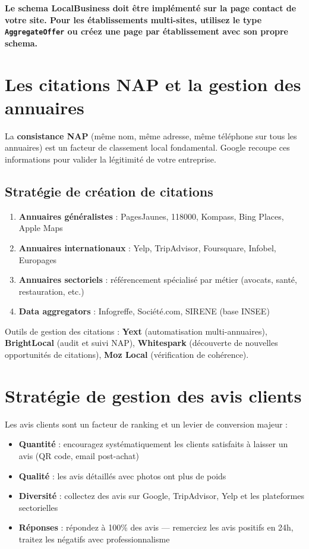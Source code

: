 \documentclass[12pt,a4paper,twoside]{report}
\newcommand{\keyword}[1]{\textbf{\textcolor{googleblue}{#1}}}
\newcommand{\important}[1]{\textbf{\textcolor{googlered}{#1}}}
\begin{document}
\important{Le schema LocalBusiness doit être implémenté sur la page contact de votre site. Pour les établissements multi-sites, utilisez le type \texttt{AggregateOffer} ou créez une page par établissement avec son propre schema.}

\section{Les citations NAP et la gestion des annuaires}

La \keyword{consistance NAP} (même nom, même adresse, même téléphone sur tous les annuaires) est un facteur de classement local fondamental. Google recoupe ces informations pour valider la légitimité de votre entreprise.

\subsection{Stratégie de création de citations}

\begin{enumerate}
    \item \textbf{Annuaires généralistes} : PagesJaunes, 118000, Kompass, Bing Places, Apple Maps
    \item \textbf{Annuaires internationaux} : Yelp, TripAdvisor, Foursquare, Infobel, Europages
    \item \textbf{Annuaires sectoriels} : référencement spécialisé par métier (avocats, santé, restauration, etc.)
    \item \textbf{Data aggregators} : Infogreffe, Société.com, SIRENE (base INSEE)
\end{enumerate}

\begin{toolsbox}
Outils de gestion des citations : \keyword{Yext} (automatisation multi-annuaires), \keyword{BrightLocal} (audit et suivi NAP), \keyword{Whitespark} (découverte de nouvelles opportunités de citations), \keyword{Moz Local} (vérification de cohérence).
\end{toolsbox}

\section{Stratégie de gestion des avis clients}

Les avis clients sont un facteur de ranking et un levier de conversion majeur :

\begin{itemize}
    \item \textbf{Quantité} : encouragez systématiquement les clients satisfaits à laisser un avis (QR code, email post-achat)
    \item \textbf{Qualité} : les avis détaillés avec photos ont plus de poids
    \item \textbf{Diversité} : collectez des avis sur Google, TripAdvisor, Yelp et les plateformes sectorielles
    \item \textbf{Réponses} : répondez à 100\% des avis --- remerciez les avis positifs en 24h, traitez les négatifs avec professionnalisme
\end{itemize}
\end{document}
